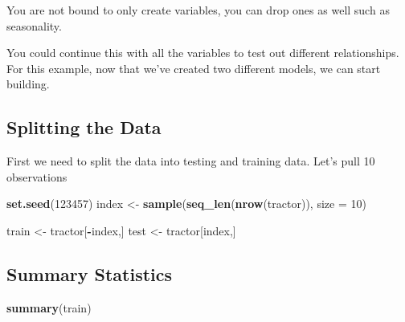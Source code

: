 \documentclass[
]{article}
\newenvironment{Shaded}{\begin{snugshade}}{\end{snugshade}}
\newcommand{\AttributeTok}[1]{\textcolor[rgb]{0.13,0.29,0.53}{#1}}
\newcommand{\DecValTok}[1]{\textcolor[rgb]{0.00,0.00,0.81}{#1}}
\newcommand{\FunctionTok}[1]{\textcolor[rgb]{0.13,0.29,0.53}{\textbf{#1}}}
\newcommand{\NormalTok}[1]{#1}
\newcommand{\OtherTok}[1]{\textcolor[rgb]{0.56,0.35,0.01}{#1}}
\newcommand{\SpecialCharTok}[1]{\textcolor[rgb]{0.81,0.36,0.00}{\textbf{#1}}}
\begin{document}
You are not bound to only create variables, you can drop ones as well
such as seasonality.

You could continue this with all the variables to test out different
relationships. For this example, now that we've created two different
models, we can start building.

\subsection{Splitting the Data}\label{splitting-the-data}

First we need to split the data into testing and training data. Let's
pull 10 observations

\begin{Shaded}
\begin{Highlighting}[]
\FunctionTok{set.seed}\NormalTok{(}\DecValTok{123457}\NormalTok{)}
\NormalTok{index }\OtherTok{\textless{}{-}} \FunctionTok{sample}\NormalTok{(}\FunctionTok{seq\_len}\NormalTok{(}\FunctionTok{nrow}\NormalTok{(tractor)), }\AttributeTok{size =} \DecValTok{10}\NormalTok{)}

\NormalTok{train }\OtherTok{\textless{}{-}}\NormalTok{ tractor[}\SpecialCharTok{{-}}\NormalTok{index,]}
\NormalTok{test }\OtherTok{\textless{}{-}}\NormalTok{ tractor[index,]}
\end{Highlighting}
\end{Shaded}

\subsection{Summary Statistics}\label{summary-statistics}

\begin{Shaded}
\begin{Highlighting}[]
\FunctionTok{summary}\NormalTok{(train)}
\end{Highlighting}
\end{Shaded}
\end{document}
